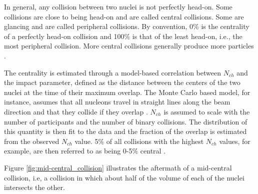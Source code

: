 In general, any collision between two nuclei is not perfectly head-on. Some collisions are close to being head-on and are called central collisions. Some are glancing and are called peripheral collisions. %
By convention, 0\% is the centrality of a perfectly head-on collision and 100\% is that of the least head-on, i.e., the most peripheral collision. More central collisions generally produce more particles \cite{Connors:2017ptx}.

The centrality is estimated through a model-based correlation between $N_{ch}$ and the impact parameter, defined as the distance between the centers of the two nuclei at the time of their maximum overlap. The Monte Carlo based model, for instance, assumes that all nucleons travel in straight lines along the beam direction \cite{Loizides:2014vua} and that they collide if they overlap \cite{Miller:2007ri}. $N_{ch}$ is assumed to scale with the number of participants and the number of binary collisions. The distribution of this quantity is then fit to the data and the fraction of the overlap is estimated from the observed $N_{ch}$ value. 5\% of all collisions with the highest $N_{ch}$ values, for example, are then referred to as being 0-5\% central \cite{Connors:2017ptx}.

Figure \ref{fig:mid-central_collision} illustrates the aftermath of a mid-central collision, i.e, a collision in which about half of the volume of each of the nuclei intersects the other.%

